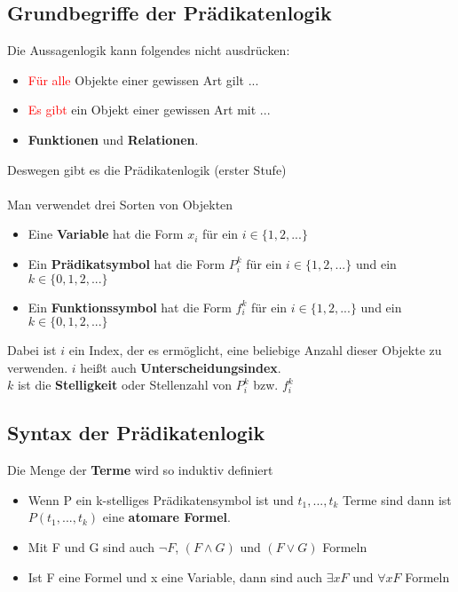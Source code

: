 \documentclass{article}
\begin{document}
	\subsection{Grundbegriffe der Prädikatenlogik}
	Die Aussagenlogik kann folgendes nicht ausdrücken:
	\begin{itemize}
		\item \textcolor{red}{Für alle} Objekte einer gewissen Art gilt ...
		\item \textcolor{red}{Es gibt} ein Objekt einer gewissen Art mit ...
		\item \textbf{Funktionen} und \textbf{Relationen}.
	\end{itemize}
	Deswegen gibt es die Prädikatenlogik (erster Stufe) \\
	\\
	Man verwendet drei Sorten von Objekten
	\begin{itemize}
		\item Eine \textbf{Variable} hat die Form $x_i$ für ein $i \in \{1,2,...\}$
		\item Ein \textbf{Prädikatsymbol} hat die Form $P^k_i$ für ein $i \in \{1,2,...\}$ und ein $k \in \{0,1,2,...\}$
		\item Ein \textbf{Funktionssymbol} hat die Form $f^k_i$ für ein $i \in \{1,2,...\}$ und ein $k \in \{0,1,2,...\}$
	\end{itemize}
	Dabei ist $i$ ein Index, der es ermöglicht, eine beliebige Anzahl dieser Objekte zu verwenden. $i$ heißt auch \textbf{Unterscheidungsindex}. \\
	$k$ ist die \textbf{Stelligkeit} oder Stellenzahl von $P^k_i$ bzw. $f^k_i$
	\subsection{Syntax der Prädikatenlogik}
	Die Menge der \textbf{Terme} wird so induktiv definiert
	\begin{itemize}
		\item Wenn P ein k-stelliges Prädikatensymbol ist und $t_1, ..., t_k$ Terme sind dann ist $P(t_1,...,t_k)$ eine \textbf{atomare Formel}.
		\item Mit F und G sind auch $\neg F$, $(F \wedge G)$ und $(F \vee G)$ Formeln
		\item Ist F eine Formel und x eine Variable, dann sind auch $\exists x F$ und $\forall x F$ Formeln
	\end{itemize}
\end{document}

